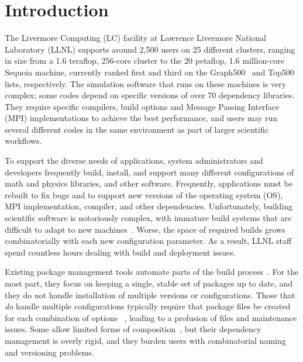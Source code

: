 
\section{Introduction}
\label{sec:intro}

The Livermore Computing (LC) facility at Lawrence Livermore National Laboratory
(LLNL) supports around 2,500 users on 25 different clusters, ranging
in size from a 1.6 teraflop, 256-core cluster to the
20 petaflop, 1.6 million-core Sequoia machine, currently ranked first and
third on the Graph500~\cite{graph500} and Top500~\cite{top500}
lists, respectively.
%
%
The simulation software that runs on these machines is very complex; some
codes depend on specific versions of over 70 dependency libraries.
They require specific compilers, build options and Message Passing Interface (MPI)
implementations to
achieve the best performance, and users may run several
different codes in the same environment as part of larger
scientific workflows.

To support the diverse needs of applications, system administrators
and developers frequently build, install, and support many
different configurations of math and physics libraries, and
other software.  Frequently, applications must be rebuilt to fix bugs
and to support new versions of the operating system (OS), 
MPI implementation, compiler, and other
dependencies.  Unfortunately, building scientific software is
notoriously complex, with immature build systems that are difficult to
adapt to new
machines~\cite{dubois+:comp-sci-eng,hoste+:pyhpc12,wilson+:corr}.
Worse, the space of required builds grows combinatorially with each
new configuration parameter. As a result, LLNL staff spend countless
hours dealing with build and deployment issues.

Existing package management tools automate parts of the build
process~\cite{bsdports,digirolamo:smithy,dolstra+:icfp08,dolstra+:lisa04,hashdist,homebrew,hoste+:pyhpc12,macports,thiruvathukal:gentoo04}.
For the most part, they focus on keeping a single, stable set of
packages up to date, and they do not handle installation of multiple versions or
configurations.  Those that {\it do} handle multiple configurations
typically require that package files be created for each combination of
options~ \cite{digirolamo:smithy,dolstra+:icfp08,dolstra+:lisa04,hoste+:pyhpc12},
leading to a profusion of files and maintenance issues.
Some allow limited forms of 
composition~\cite{hoste+:pyhpc12,dolstra+:icfp08,dolstra+:lisa04}, but their
dependency management is overly rigid, and they burden users with
combinatorial naming and versioning problems.

